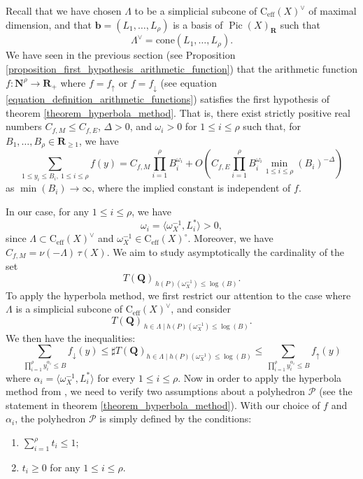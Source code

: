 \documentclass{proc-l}
\newcommand{\R}{\mathbf{R}}
\newcommand{\N}{\mathbf{N}}
\newcommand{\Q}{\mathbf{Q}}
\newcommand{\base}{\mathbf{b}}
\newcommand{\cone}{\text{C}_{\text{eff}}(X)}
\DeclareMathOperator{\Pic}{Pic}
\newcommand{\w}{\omega}
\theoremstyle{definition}
\theoremstyle{remark}
\numberwithin{equation}{section}
\begin{document}
Recall that we have chosen $\Lambda$ to be a simplicial subcone of $\cone^{\vee}$ of maximal dimension, and that $\base = (L_1, \dots, L_\rho)$ is a basis of $\Pic(X)_{\R}$ such that $$\Lambda^{\vee} = \mathrm{cone}(L_1, \dots, L_{\rho}).$$We have seen in the previous section (see Proposition \ref{proposition_first_hypothesis_arithmetic_function}) that the arithmetic function $f: \N^{\rho} \rightarrow \R_+ $ where $f = f_{\uparrow}$ or $f = f_{\downarrow}$ (see equation \ref{equation_definition_arithmetic_functions}) satisfies the first hypothesis of theorem \ref{theorem_hyperbola_method}. That is, there exist strictly positive real numbers $C_{f,M} \leqslant C_{f,E}$, $\Delta > 0$, and $\w_i > 0$ for $1 \leqslant i \leqslant \rho$ such that, 
for $B_1, \dots, B_{\rho} \in \R_{\geqslant 1}$, we have
$$
\sum\limits_{1 \leqslant y_i \leqslant B_i,\ 1 \leqslant i \leqslant \rho} f(y) 
= C_{f,M} \prod\limits_{i = 1}^{\rho} B_i^{\w_i} 
+ O \!\left( C_{f,E} \prod\limits_{i = 1}^{\rho} B_i^{\w_i} 
\min\limits_{1 \leqslant i \leqslant {\rho}}(B_i)^{-\Delta} \right)
$$as $ \min(B_i) \rightarrow \infty$, where the implied constant is independent of $f$. 

In our case, for any $1 \leqslant i \leqslant \rho$, we have
\[
\omega_i = \langle \omega_X^{-1}, L_i^* \rangle > 0,
\]
since $\Lambda \subset \cone^{\vee}$ and $\omega_X^{-1} \in \cone^{\circ}$.
Moreover, we have $C_{f,M} = \nu(-\Lambda)\,\tau(X)$.
We aim to study asymptotically the cardinality of the set
\[
T(\Q)_{\,h(P)(\omega_X^{-1}) \leqslant \log(B)}.
\]
To apply the hyperbola method, we first restrict our attention to the case where
$\Lambda$ is a simplicial subcone of $\cone^{\vee}$, and consider
\[
T(\Q)_{\,h\in \Lambda \mid h(P)(\omega_X^{-1}) \leqslant \log(B)}.
\]We then have the inequalities:
\begin{equation}\label{equation_encadrement_arithmetic_function}
    \sum\limits_{\prod\limits_{i = 1}^{\rho} y_i^{\alpha_{i}} \leqslant B } f_{\downarrow}(y) \leqslant \sharp T(\Q)_{h\in \Lambda \mid h(P)(\w_{X}^{-1}) \leqslant \log(B)} \leqslant \sum\limits_{\prod\limits_{i = 1}^{\rho} y_i^{\alpha_{i}} \leqslant B } f_{\uparrow}(y)
\end{equation}where $\alpha_{i} = \langle \w_{X}^{-1}, L_i^* \rangle$ for every $1 \leqslant i \leqslant \rho$. Now in order to apply the hyperbola method from \cite{pieropan_hyperbola_method}, we need to verify two assumptions about a polyhedron $\mathcal{P}$ (see the statement in theorem \ref{theorem_hyperbola_method}). With our choice of $f$ and $\alpha_i$, the polyhedron $\mathcal{P}$ is simply defined by the conditions:
\begin{enumerate}
    \item $\sum\limits_{i = 1}^{\rho } t_i \leqslant 1$;
    \item $t_i \geqslant 0$ for any $1 \leqslant i \leqslant \rho$.
\end{enumerate}
\end{document}
